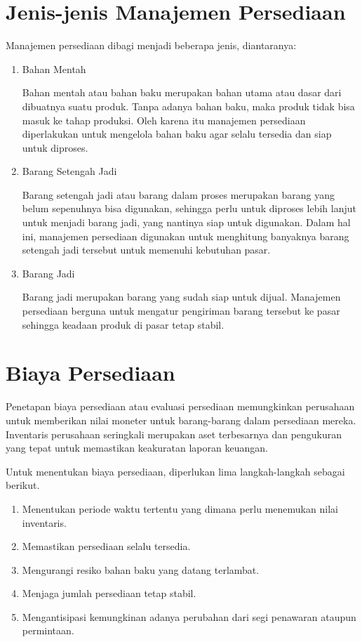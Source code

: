 \begin{spacing}{1.5}
\section{Jenis-jenis Manajemen Persediaan}

Manajemen persediaan dibagi menjadi beberapa jenis, diantaranya:

\begin{enumerate}
	\item Bahan Mentah
	
	Bahan mentah atau bahan baku merupakan bahan utama atau dasar dari dibuatnya suatu produk. Tanpa adanya bahan baku, maka produk tidak bisa masuk ke tahap produksi. Oleh karena itu manajemen persediaan diperlakukan untuk mengelola bahan baku agar selalu tersedia dan siap untuk diproses.
	
	\item Barang Setengah Jadi
	
	Barang setengah jadi atau barang dalam proses merupakan barang yang belum sepenuhnya bisa digunakan, sehingga perlu untuk diproses lebih lanjut untuk menjadi barang jadi, yang nantinya siap untuk digunakan. Dalam hal ini, manajemen persediaan digunakan untuk menghitung banyaknya barang setengah jadi tersebut untuk memenuhi kebutuhan pasar.

	\item Barang Jadi
	
	Barang jadi merupakan barang yang sudah siap untuk dijual. Manajemen persediaan berguna untuk mengatur pengiriman barang tersebut ke pasar sehingga keadaan produk di pasar tetap stabil.
\end{enumerate}

\section{Biaya Persediaan}

Penetapan biaya persediaan atau evaluasi persediaan memungkinkan perusahaan untuk memberikan nilai moneter untuk barang-barang dalam persediaan mereka. Inventaris perusahaan seringkali merupakan aset terbesarnya dan pengukuran yang tepat untuk memastikan keakuratan laporan keuangan.

Untuk menentukan biaya persediaan, diperlukan lima langkah-langkah sebagai berikut.

\begin{enumerate}
	\item Menentukan periode waktu tertentu yang dimana perlu menemukan nilai inventaris.
	\item Memastikan persediaan selalu tersedia.
	\item Mengurangi resiko bahan baku yang datang terlambat.
	\item Menjaga jumlah persediaan tetap stabil.
	\item Mengantisipasi kemungkinan adanya perubahan dari segi penawaran ataupun permintaan.
\end{enumerate}


\end{spacing}
